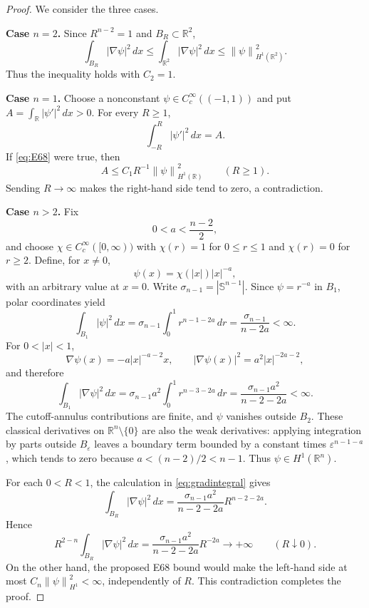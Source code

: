 \documentclass[11pt]{article}
\newcommand{\Rn}{\mathbb{R}^{n}}
\newcommand{\norm}[1]{\left\lVert #1\right\rVert}
\begin{document}
\begin{proof}
We consider the three cases.

\medskip\noindent
\textbf{Case $n=2$.} Since $R^{n-2}=1$ and $B_R\subset\mathbb R^2$,
\[
\int_{B_R}|\nabla\psi|^2\,dx
\leq\int_{\mathbb R^2}|\nabla\psi|^2\,dx
\leq\norm{\psi}_{H^1(\mathbb R^2)}^2.
\]
Thus the inequality holds with $C_2=1$.

\medskip\noindent
\textbf{Case $n=1$.} Choose a nonconstant
$\psi\in C_c^\infty((-1,1))$ and put
$A=\int_{\mathbb R}|\psi'|^2\,dx>0$.
For every $R\geq1$,
\[
\int_{-R}^{R}|\psi'|^2\,dx=A.
\]
If \eqref{eq:E68} were true, then
\[
A\leq C_1R^{-1}\norm{\psi}_{H^1(\mathbb R)}^2
\qquad(R\geq1).
\]
Sending $R\to\infty$ makes the right-hand side tend to zero, a
contradiction.

\medskip\noindent
\textbf{Case $n>2$.} Fix
\[
0<a<\frac{n-2}{2},
\]
and choose $\chi\in C_c^\infty([0,\infty))$ with
$\chi(r)=1$ for $0\leq r\leq1$ and $\chi(r)=0$ for $r\geq2$.
Define, for $x\neq0$,
\[
\psi(x)=\chi(|x|)|x|^{-a},
\]
with an arbitrary value at $x=0$. Write
$\sigma_{n-1}=|\mathbb S^{n-1}|$. Since $\psi=r^{-a}$ in $B_1$,
polar coordinates yield
\begin{equation}\label{eq:L2integral}
\int_{B_1}|\psi|^2\,dx
=\sigma_{n-1}\int_0^1r^{n-1-2a}\,dr
=\frac{\sigma_{n-1}}{n-2a}<\infty.
\end{equation}
For $0<|x|<1$,
\[
\nabla\psi(x)=-a|x|^{-a-2}x,
\qquad |\nabla\psi(x)|^2=a^2|x|^{-2a-2},
\]
and therefore
\begin{equation}\label{eq:gradintegral}
\int_{B_1}|\nabla\psi|^2\,dx
=\sigma_{n-1}a^2\int_0^1r^{n-3-2a}\,dr
=\frac{\sigma_{n-1}a^2}{n-2-2a}<\infty.
\end{equation}
The cutoff-annulus contributions are finite, and $\psi$ vanishes
outside $B_2$. These classical derivatives on $\Rn\setminus\{0\}$
are also the weak derivatives: applying integration by parts outside
$B_\varepsilon$ leaves a boundary term bounded by a constant times
$\varepsilon^{n-1-a}$, which tends to zero because
$a<(n-2)/2<n-1$. Thus $\psi\in H^1(\Rn)$.

For each $0<R<1$, the calculation in \eqref{eq:gradintegral} gives
\begin{equation}\label{eq:localexact}
\int_{B_R}|\nabla\psi|^2\,dx
=\frac{\sigma_{n-1}a^2}{n-2-2a}R^{n-2-2a}.
\end{equation}
Hence
\begin{equation}\label{eq:blowup}
R^{2-n}\int_{B_R}|\nabla\psi|^2\,dx
=\frac{\sigma_{n-1}a^2}{n-2-2a}R^{-2a}
\longrightarrow+\infty
\qquad(R\downarrow0).
\end{equation}
On the other hand, the proposed E68 bound would make the left-hand
side at most $C_n\norm{\psi}_{H^1}^2<\infty$, independently of $R$.
This contradiction completes the proof.
\end{proof}
\end{document}
